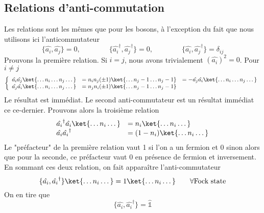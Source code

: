 \subsection{Relations d’anti-commutation}
Les relations sont les mêmes que pour les bosons, à l'exception du fait que nous utilisons ici 
l'anticommutateur
\begin{equation}
\{\hat{a_i},\hat{a_j}\}=0,\qquad\qquad \{\hat{a_i}^\dagger,\hat{a_j}^\dagger\}=0,\qquad\qquad
\{\hat{a_i},\hat{a_j}^\dagger\} = \delta_{ij}
\end{equation}
Prouvons la première relation. Si $i=j$, nous avons trivialement $(\hat{a_i})^2=0$. Pour $i\neq j$
\begin{equation}
\left\{\begin{array}{lll}
\hat{a_i}\hat{a_j}\ket{\dots n_i\dots n_j\dots} &= n_in_j(\pm 1)\ket{\dots n_j-1\dots n_j-1} &= 
-\hat{a_j}\hat{a_i}\ket{\dots n_i\dots n_j\dots}\\
\hat{a_j}\hat{a_i}\ket{\dots n_i\dots n_j\dots} &= n_jn_i(\pm 1)\ket{\dots n_j-1\dots n_j-1} 
\end{array}\right.
\end{equation}
Le résultat est immédiat. Le second anti-commutateur est un résultat immédiat ce ce-dernier. Prouvons alors la troisième relation
\begin{equation}
\begin{array}{ll}
\hat{a_i}^\dagger\hat{a_i}\ket{\dots n_i\dots} &= n_i\ket{\dots n_i\dots}\\
\hat{a_i}\hat{a_i}^\dagger &=(1-n_i)\ket{\dots n_i\dots}
\end{array}
\end{equation}
Le "préfacteur" de la première relation vaut 1 si l'on a un fermion et 0 sinon alors que pour la 
seconde, ce préfacteur vaut 0 en présence de fermion et inversement. En sommant ces deux relation, 
on fait apparaître l'anti-commutateur
\begin{equation}
\{\hat{a_i},\hat{a_i}^\dagger\}\ket{\dots n_i\dots} = 1\ket{\dots n_i\dots}\qquad\forall \text{Fock state}
\end{equation}
On en tire que 
\begin{equation}
\{\hat{a_i},\hat{a_i}^\dagger\} = \hat{\mathbb{1}}
\end{equation}

